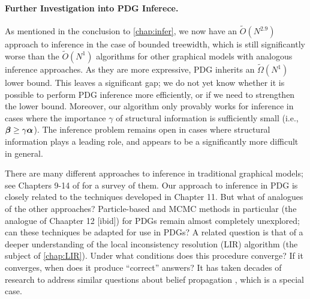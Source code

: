 \paragraph{Further Investigation into PDG Inferece.}
As mentioned in the conclusion to \cref{chap:infer}, we now have an $\tilde O(N^{2.9})$ approach to inference in the case of bounded treewidth,
which is still significantly worse than the $\tilde O(N^1)$ algorithms for other graphical models with analogous inference approaches.
As they are more expressive, PDG inherits an $\tilde \Omega(N^1)$ lower bound.
This leaves a significant gap;
we do not yet know whether it is possible to perform PDG inference more efficiently, or if we need to strengthen the lower bound. 
Moreover, our algorithm only provably works for inference in cases where 
    the importance $\gamma$ of structural information is sufficiently small
        (i.e., $\boldsymbol\beta \ge \gamma\boldsymbol\alpha$). 
The inference problem remains open in cases where structural information plays a leading role, and appears to be a significantly more difficult in general. 

There are many different approaches to inference in traditional graphical models;
see Chapters 9-14 of \citet{KF09} for a survey of them.
Our approach to inference in PDG is closely related to the techniques developed in Chapter 11. But what of analogues of the other approaches? 
Particle-based and MCMC methods in particular (the analogue of Chaapter 12 [ibid])
for PDGs remain almost completely unexplored; can these techniques be adapted for use in PDGs?
%    
%
A related question is that of a deeper understanding of the local inconsistency resolution (LIR) algorithm (the subject of \cref{chap:LIR}). 
Under what conditions does this procedure converge?
If it converges, when does it produce ``correct'' answers?
It has taken decades of research to address similar questions about belief propagation \citep{yedida-genpb,wiegerinck-fracbp,minka2005divergence}, which is a special case.


